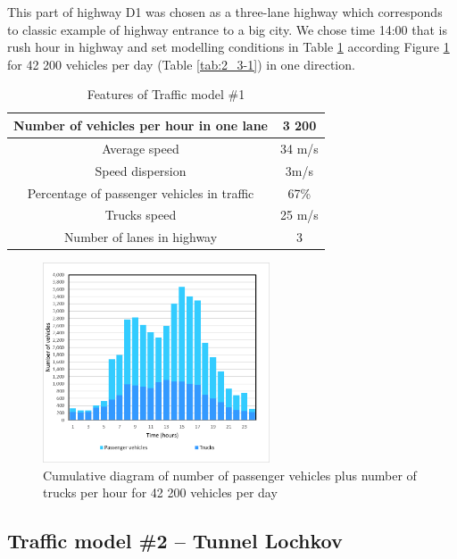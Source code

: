 This part of highway D1 was chosen as a three-lane highway which corresponds to classic example of highway entrance to a big city. We chose time 14:00 that is rush hour in highway and set modelling conditions in Table  \ref{tab:2_5_1-1} according Figure \ref{fig:2_5_1-1} for 42 200 vehicles per day (Table \ref{tab:2_3-1}) in one direction.

\begin{table}[ph]
\begin{centering}
\begin{tabular}{|c|c|}
\hline 
Number of vehicles per hour in one lane &	3 200\tabularnewline
\hline 
Average speed &	34 m/s\tabularnewline
\hline 
Speed dispersion &	3m/s\tabularnewline
\hline 
Percentage of passenger vehicles in traffic & 	67\%\tabularnewline
\hline 
Trucks speed &	25 m/s\tabularnewline
\hline 
Number of lanes in highway &	3\tabularnewline
\hline 
\end{tabular}
\centering
\protect\caption{\label{tab:2_5_1-1}Features of Traffic model \#1}
\end{centering}
\end{table}


\begin{figure}[ph]
\begin{centering}
\includegraphics[width=0.60\textwidth,height=0.60\textheight,keepaspectratio]{figures/Chapter_2/2_Cum_diag_day_42200.png}
\centering
\protect\caption{\label{fig:2_5_1-1}Cumulative diagram of number of passenger vehicles plus number of trucks per hour for 42 200 vehicles per day}

\end{centering}
\end{figure}

\subsection*{Traffic model \#2 – Tunnel Lochkov}

